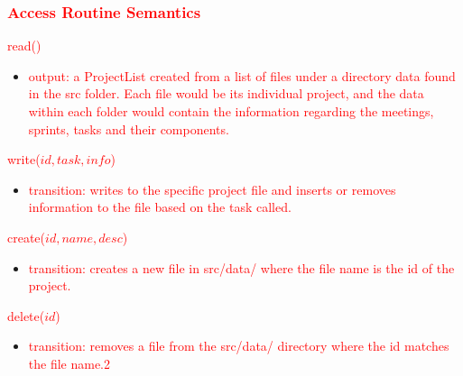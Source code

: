 \documentclass[12pt, titlepage]{article}
\begin{document}
\subsubsection*{\textcolor{red}{Access Routine Semantics}}
\noindent \textcolor{red}{read()}
\begin{itemize}
    \item \textcolor{red}{output: a ProjectList created from a list of files under a directory data found in the src folder. Each file would be its individual project, and the data within each folder would contain the information regarding the meetings, sprints, tasks and their components.}
\end{itemize}

\noindent \textcolor{red}{write($id, task, info$)}
\begin{itemize}
    \item \textcolor{red}{transition: writes to the specific project file and inserts or removes information to the file based on the task called.}
\end{itemize}

\noindent \textcolor{red}{create($id, name, desc$)}
\begin{itemize}
    \item \textcolor{red}{transition: creates a new file in src/data/ where the file name is the id of the project.}
\end{itemize}

\noindent \textcolor{red}{delete($id$)}
\begin{itemize}
    \item \textcolor{red}{transition: removes a file from the src/data/ directory where the id matches the file name.2}
\end{itemize}
\end{document}
